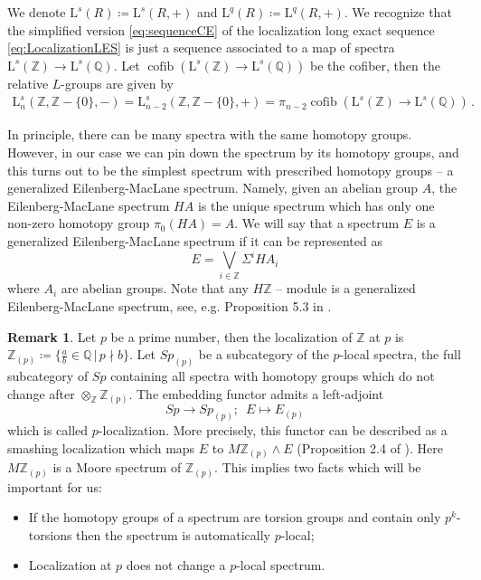 \documentclass[sn-mathphys-num]{sn-jnl}
\theoremstyle{definition}
\newtheorem{remark}[lemma]{Remark}
\numberwithin{equation}{section}
\theoremstyle{definition}
\def\L{{\mbox{L}}}
\def\IQ{\mathbb{Q}}
\def\IZ{{\mathbb{Z}}}
\def\bZ{\mathbb{Z}}
\begin{document}
We denote $\L^s(R)\coloneqq \L^s(R,+)$ and $\L^q(R)\coloneqq \L^q(R,+)$. We recognize that the simplified version \eqref{eq:sequenceCE} of the localization long exact sequence \eqref{eq:LocalizationLES} is just a sequence associated to a map of spectra $\L^s(\IZ)\to \L^s(\IQ)$. Let $\operatorname{cofib}(\L^s(\IZ)\rightarrow \L^s(\IQ))$ be the cofiber, then the relative $L$-groups are given by
\begin{align}
    \L^s_n(\IZ,\IZ-\{0\},-)=\L^s_{n-2}(\IZ,\IZ-\{0\},+)=\pi_{n-2}\operatorname{cofib}(\L^s(\IZ)\rightarrow \L^s(\IQ))\,.
\end{align}

In principle, there can be many spectra with the same homotopy groups. However, in our case we can pin down the spectrum by its homotopy groups, and this turns out to be the simplest spectrum with prescribed homotopy groups -- a generalized Eilenberg-MacLane spectrum. Namely, given an abelian group $A$,
the Eilenberg-MacLane spectrum $HA$ is the unique spectrum which has only one non-zero homotopy group $\pi_0(HA)=A$. We will say that a spectrum $E$ is a generalized Eilenberg-MacLane spectrum if it can be represented as 
$$E=\bigvee_{i\in \mathbb Z}\Sigma^i HA_i$$
where $A_i$ are abelian groups. Note that any $H\bZ$ -- module is a generalized Eilenberg-MacLane spectrum, see, e.g. Proposition 5.3 in \cite{Casacuberta}.

\begin{remark}
Let  $p$ be a prime number, then the localization of $\IZ$ at $p$ is $ \IZ_{(p)}\coloneqq\{\frac{a}{b}\in \IQ\,|\,p\nmid b\}$. Let $Sp_{(p)}$ be a subcategory of the $p$-local spectra, the full subcategory of $Sp$ containing all spectra with homotopy groups which do not change after $\otimes_{\IZ}\IZ_{(p)}$. The embedding functor admits a left-adjoint
$$Sp\to Sp_{(p)}; \,\,\, E\mapsto E_{(p)}$$
which is called $p$-localization. More precisely, this functor can be described as a smashing  localization which maps $E$ to $M\IZ_{(p)}\wedge E$ (Proposition 2.4 of \cite{BOUSFIELD1979257}). Here $M\IZ_{(p)}$ is a Moore spectrum of $\bZ_{(p)}$. This implies two facts which will be important for us:
\begin{itemize}
    \item If the homotopy groups of a spectrum are torsion groups and contain only $p^k$-torsions then the spectrum is automatically $p$-local;
    \item  Localization at $p$ does not change a $p$-local spectrum.
\end{itemize}
\end{remark}  
\end{document}
